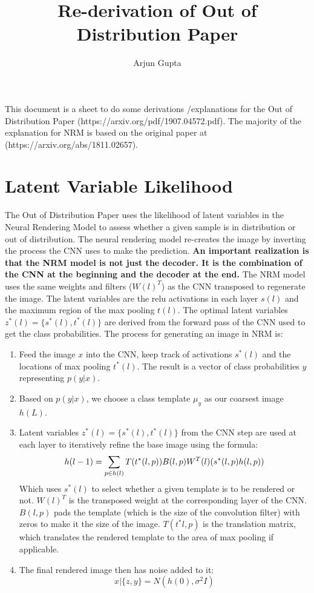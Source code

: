 \documentclass{report}
\title{Re-derivation of Out of Distribution Paper}
\author{Arjun Gupta}
\begin{document}
	\maketitle 
	
	This document is a sheet to do some derivations /explanations for the Out of Distribution Paper (https://arxiv.org/pdf/1907.04572.pdf). The majority of the explanation for NRM is based on the original paper at (https://arxiv.org/abs/1811.02657).
	
	\section{Latent Variable Likelihood}
	The Out of Distribution Paper uses the likelihood of latent variables in the Neural Rendering Model to assess whether a given sample is in distribution or out of distribution. The neural rendering model re-creates the image by inverting the process the CNN uses to make the prediction. \textbf{An important realization is that the NRM model is not just the decoder. It is the combination of the CNN at the beginning and the decoder at the end.} The NRM model uses the same weights and filters ($W(l)^T$) as the CNN transposed to regenerate the image. The latent variables are the relu activations in each layer $s(l)$ and the maximum region of the max pooling $t(l)$. The optimal latent variables $z^*(l) = \{s^*(l), t^*(l)\}$ are derived from the forward pass of the CNN used to get the class probabilities. The process for generating an image in NRM is:
	\begin{enumerate}
		\item Feed the image $x$ into the CNN, keep track of activations $s^*(l)$ and the locations of max pooling $t^*(l)$. The result is a vector of class probabilities $y$ representing $p(y|x)$.
		\item Based on $p(y|x)$, we choose a class template $\mu_y$ as our coarsest image $h(L)$.
		\item Latent variables $z^*(l) = \{s^*(l), t^*(l)\}$ from the CNN step are used at each layer to iteratively refine the base image using the formula:
		\begin{equation}
			h(l-1) = \sum_{p \in h(l)} T(t^*(l, p))B(l,p)W^T(l)(s^*(l, p) h(l, p))\\
		\end{equation}
		Which uses $s^*(l)$ to select whether a given template is to be rendered or not. $W(l)^T$ is the transposed weight at the corresponding layer of the CNN. $B(l,p)$ pads the template (which is the size of the convolution filter) with zeros to make it the size of the image. $T(t^*l,p)$ is the translation matrix, which translates the rendered template to the area of max pooling if applicable.
		\item The final rendered image then has noise added to it:
		\begin{equation}
			x | \{z, y\} = N(h(0), \sigma^2I)
		\end{equation}
	\end{enumerate}	
	
\end{document}
